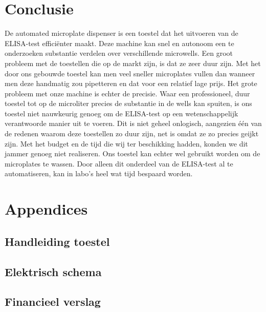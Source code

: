 \documentclass[a4paper,twoside,kulak]{kulakreport} %
\begin{document}
\chapter{Conclusie}

De automated microplate dispenser is een toestel dat het uitvoeren van de ELISA-test  efficiënter maakt. Deze machine kan snel en autonoom een te onderzoeken substantie verdelen over verschillende microwells. Een groot probleem met de toestellen die op de markt zijn, is dat ze zeer duur zijn. Met het door ons gebouwde toestel kan men veel sneller microplates vullen dan wanneer men deze handmatig zou pipetteren en dat voor een relatief lage prijs. Het grote probleem met onze machine is echter de precisie. Waar een professioneel, duur toestel tot op de microliter precies de substantie in de wells kan spuiten, is ons toestel niet nauwkeurig genoeg om de ELISA-test op een wetenschappelijk verantwoorde manier uit te voeren. Dit is niet geheel onlogisch, aangezien één van de redenen waarom deze toestellen zo duur zijn, net is omdat ze zo precies geijkt zijn. Met het budget en de tijd die wij ter beschikking hadden, konden we dit jammer genoeg niet realiseren. Ons toestel kan echter wel gebruikt worden om de microplates te wassen. Door alleen dit onderdeel van de ELISA-test al te automatiseren, kan in labo's heel wat tijd bespaard worden.

\clearpage
\nocite{wikipedia,LabX}



\chapter*{Appendices}

\section*{Handleiding toestel}



\section*{Elektrisch schema}
\label{Appendix: elektrisch schema}


\section*{Financieel verslag}
\label{Appendix: Financieel verslag}
\end{document}
